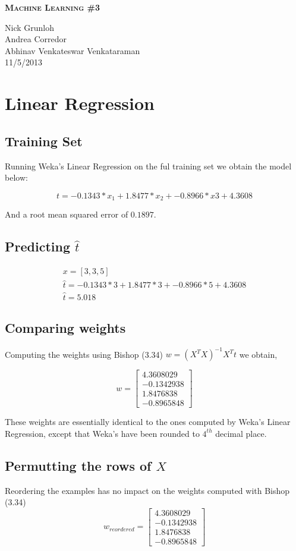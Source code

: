 \documentclass{article}
\newcommand{\header}[5]{
        \begin{minipage}[h!]{0.63\textwidth}
                \centering
                { \LARGE \textbf{ \textsc{#1} } }
        \end{minipage}
        \begin{minipage}[h!]{0.37\textwidth}
                \centering
                {#2}\\
                {#3}\\
        \end{minipage}
}
\begin{document}
\header{Machine Learning \#3}
       {Nick Grunloh\\Andrea Corredor\\Abhinav Venkateswar Venkataraman}
       {11/5/2013}
\\\\


\section{Linear Regression}

\subsection*{Training Set}
Running Weka's Linear Regression on the ful training set we obtain the model below:

 \[ t =    -0.1343 * x_{1} +  1.8477 * x_{2} + -0.8966 * x{3} + 4.3608 \]

\noindent And a root mean squared error of $0.1897$. 

\subsection*{Predicting $\hat{t}$}

\begin{align*}
 x = [3,3,5]  \\
 \hat{t} = -0.1343 * 3 +  1.8477 * 3 + -0.8966 * 5 + 4.3608  \\
\hat{t} = 5.018 
\end{align*}

\subsection*{Comparing weights}
Computing the weights using Bishop (3.34) $ w = (X^{T}X)^{-1}X^{T}t$  we obtain,

\[w = \begin{bmatrix}
       4.3608029  \\[0.3em]
       -0.1342938  \\[0.3em]
       1.8476838 \\[0.3em]
       -0.8965848
     \end{bmatrix} \]

These weights are essentially identical to the ones computed by Weka's Linear Regression, except that Weka's have been rounded to $4^{th}$ decimal place.

\subsection*{Permutting the rows of $X$}
Reordering the examples has no impact on the weights computed with Bishop (3.34)
\[w_{reordered} = \begin{bmatrix}
       4.3608029  \\[0.3em]
       -0.1342938  \\[0.3em]
       1.8476838 \\[0.3em]
       -0.8965848
     \end{bmatrix} \]
\end{document}
